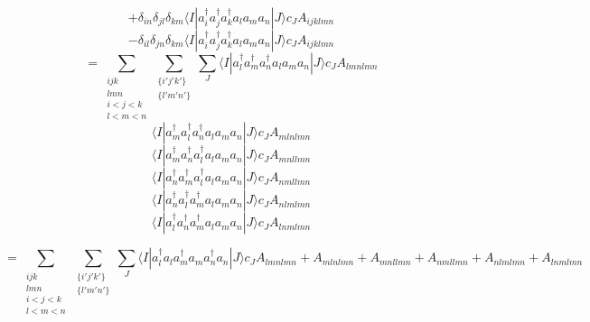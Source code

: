 \documentclass[12pt]{article}
\begin{document}
\begin{equation*}
+\delta_{in}\delta_{jl}\delta_{km}
\langle I | a^{\dagger}_{i}  a^{\dagger}_{j}a^{\dagger}_{k}  a_{l}  a_{m}a_{n}| J \rangle c_{J}   A_{ijklmn}
\end{equation*}
\begin{equation*}
-\delta_{il}\delta_{jn}\delta_{km}
\langle I | a^{\dagger}_{i}  a^{\dagger}_{j}a^{\dagger}_{k}  a_{l}  a_{m}a_{n}| J \rangle c_{J}   A_{ijklmn}
\end{equation*}
\begin{equation*}
=\sum_{\substack{ ijk \\ lmn \\ i<j<k \\  l<m<n }}
\sum_{\substack{ \{i'j'k'\} \\ \{l'm'n'\} }}
\sum_{J}
\langle I | a^{\dagger}_{l}  a^{\dagger}_{m}a^{\dagger}_{n}  a_{l}  a_{m}a_{n}| J \rangle c_{J}   A_{lmnlmn}
\end{equation*}
\begin{equation*}
\langle I | a^{\dagger}_{m}  a^{\dagger}_{l}a^{\dagger}_{n}  a_{l}  a_{m}a_{n}| J \rangle c_{J}   A_{mlnlmn}
\end{equation*}
\begin{equation*}
\langle I | a^{\dagger}_{m}  a^{\dagger}_{n}a^{\dagger}_{l}  a_{l}  a_{m}a_{n}| J \rangle c_{J}   A_{mnllmn}
\end{equation*}
\begin{equation*}
\langle I | a^{\dagger}_{n}  a^{\dagger}_{m}a^{\dagger}_{l}  a_{l}  a_{m}a_{n}| J \rangle c_{J}   A_{nmllmn}
\end{equation*}
\begin{equation*}
\langle I | a^{\dagger}_{n}  a^{\dagger}_{l}a^{\dagger}_{m}  a_{l}  a_{m}a_{n}| J \rangle c_{J}   A_{nlmlmn}
\end{equation*}
\begin{equation*}
\langle I | a^{\dagger}_{l}  a^{\dagger}_{n}a^{\dagger}_{m}  a_{l}  a_{m}a_{n}| J \rangle c_{J}   A_{lnmlmn}
\end{equation*}

\begin{equation*}
=\sum_{\substack{ ijk \\ lmn \\ i<j<k \\  l<m<n }}
\sum_{\substack{ \{i'j'k'\} \\ \{l'm'n'\} }}
\sum_{J}
\langle I | a^{\dagger}_{l}a_{l} a^{\dagger}_{m}a_{m}a^{\dagger}_{n}a_{n}| J \rangle c_{J} 
A_{lmnlmn} +A_{mlnlmn} +A_{mnllmn} +A_{nmllmn} +A_{nlmlmn} +A_{lnmlmn}
\end{equation*}
\end{document}
